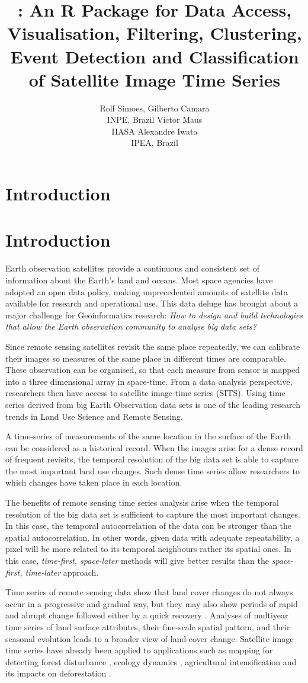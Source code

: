 \documentclass[article]{jss}
\author{
Rolf Simoes, Gilberto Camara\\INPE, Brazil \And Victor Maus\\IIASA \And Alexandre Iwata\\IPEA, Brazil
}
\title{\pkg{SITS}: An R Package for Data Access, Visualisation, Filtering,
Clustering, Event Detection and Classification of Satellite Image Time
Series}
\begin{document}
\section{Introduction}\label{introduction}

\section{Introduction}

Earth observation satellites provide a continuous and consistent set of
information about the Earth's land and oceans. Most space agencies have
adopted an open data policy, making unprecedented amounts of satellite
data available for research and operational use. This data deluge has
brought about a major challenge for Geoinformatics research:
\textit{How to design and build technologies that allow the Earth observation community to analyse big data sets?}

Since remote sensing satellites revisit the same place repeatedly, we
can calibrate their images so measures of the same place in different
times are comparable. These observation can be organised, so that each
measure from sensor is mapped into a three dimensional array in
space-time. From a data analysis perspective, researchers then have
access to satellite image time series (SITS). Using time series derived
from big Earth Observation data sets is one of the leading research
trends in Land Use Science and Remote Sensing.

A time-series of measurements of the same location in the surface of the
Earth can be considered as a historical record. When the images arise
for a dense record of frequent revisits, the temporal resolution of the
big data set is able to capture the most important land use changes.
Such dense time series allow researchers to which changes have taken
place in each location.

The benefits of remote sensing time series analysis arise when the
temporal resolution of the big data set is sufficient to capture the
most important changes. In this case, the temporal autocorrelation of
the data can be stronger than the spatial autocorrelation. In other
words, given data with adequate repeatability, a pixel will be more
related to its temporal neighbours rather its spatial ones. In this
case, \textit{time-first, space-later} methods will give better results
than the \textit{space-first, time-later} approach.

Time series of remote sensing data show that land cover changes do not
always occur in a progressive and gradual way, but they may also show
periods of rapid and abrupt change followed either by a quick recovery
\citep{Lambin2006}. Analyses of multiyear time series of land surface
attributes, their fine-scale spatial pattern, and their seasonal
evolution leads to a broader view of land-cover change. Satellite image
time series have already been applied to applications such as mapping
for detecting forest disturbance \citep{Kennedy2010}, ecology dynamics
\citep{Pasquarella2016}, agricultural intensification
\citep{Galford2008} and its impacts on deforestation \citep{Arvor2012}.
\end{document}
